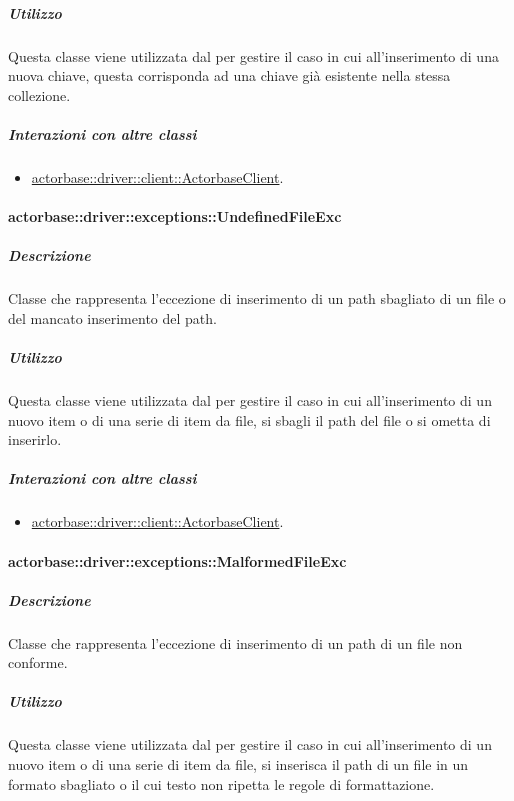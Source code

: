 \documentclass{scalatekids-article}
\begin{document}
\subparagraph{Utilizzo}

Questa classe viene utilizzata dal  per gestire il caso in cui all'inserimento di una nuova chiave, questa corrisponda ad una chiave già esistente nella stessa collezione.

\subparagraph{Interazioni con altre classi}

\begin{itemize}
	\item \hyperref[sec:actorbase::driver::client::ActorbaseClient]{actorbase::driver::client::ActorbaseClient}.
\end{itemize}

\paragraph{actorbase::driver::exceptions::UndefinedFileExc}

\subparagraph{Descrizione}

Classe che rappresenta l'eccezione di inserimento di un path sbagliato di un file o del mancato inserimento del path.

\subparagraph{Utilizzo}

Questa classe viene utilizzata dal  per gestire il caso in cui all'inserimento di un nuovo item o di una serie di item da file, si sbagli il path del file o si ometta di inserirlo.

\subparagraph{Interazioni con altre classi}

\begin{itemize}
	\item \hyperref[sec:actorbase::driver::client::ActorbaseClient]{actorbase::driver::client::ActorbaseClient}.
\end{itemize}

\paragraph{actorbase::driver::exceptions::MalformedFileExc}

\subparagraph{Descrizione}

Classe che rappresenta l'eccezione di inserimento di un path di un file non conforme.

\subparagraph{Utilizzo}

Questa classe viene utilizzata dal  per gestire il caso in cui all'inserimento di un nuovo item o di una serie di item da file, si inserisca il path di un file in un formato sbagliato o il cui testo non ripetta le regole di formattazione.
\end{document}
